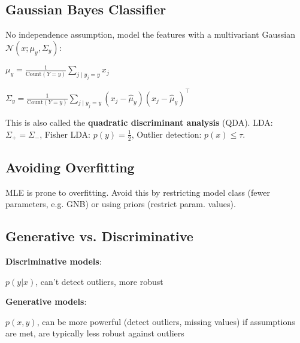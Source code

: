 \subsection*{Gaussian Bayes Classifier}

No independence assumption, model the features with a multivariant Gaussian $\mathcal{N}(x; \mu_y, \Sigma_y)$:

\quad $\mu_{y} = \frac{1}{\text{Count}(Y = y)} \sum_{j \; | \; y_j = y} x_{j}$

\quad $\Sigma_{y} = \frac{1}{\text{Count}(Y = y)} \sum_{j \; | \; y_j = y} (x_{j} - \hat \mu_{y}) (x_{j} - \hat \mu_{y})^\top$

This is also called the \textbf{quadratic discriminant analysis} (QDA). LDA: $\Sigma_+ = \Sigma_-$, Fisher LDA: $p(y) = \frac{1}{2}$, Outlier detection: $p(x) \leq \tau$.

\subsection*{Avoiding Overfitting}

MLE is prone to overfitting. Avoid this by restricting model class (fewer parameters, e.g. GNB) or using priors (restrict param. values).

\subsection*{Generative vs. Discriminative}

\textbf{Discriminative models}:

$p(y | x)$, can't detect outliers, more robust

\textbf{Generative models}:

$p(x,y)$, can be more powerful (detect outliers, missing values) if assumptions are met, are typically less robust against outliers

